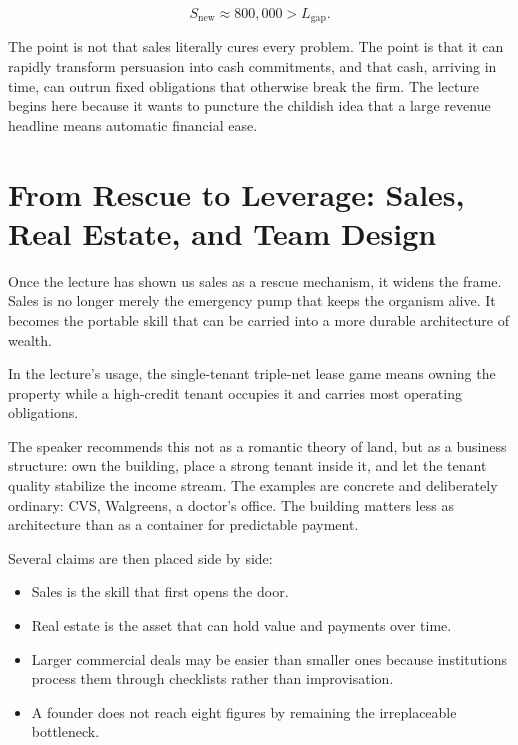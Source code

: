 \begin{equation}
S_{\text{new}} \approx 800{,}000 > L_{\text{gap}}.
\end{equation}

The point is not that sales literally cures every problem. The point is that it can rapidly transform persuasion into cash commitments, and that cash, arriving in time, can outrun fixed obligations that otherwise break the firm. The lecture begins here because it wants to puncture the childish idea that a large revenue headline means automatic financial ease.

\section{From Rescue to Leverage: Sales, Real Estate, and Team Design}

Once the lecture has shown us sales as a rescue mechanism, it widens the frame. Sales is no longer merely the emergency pump that keeps the organism alive. It becomes the portable skill that can be carried into a more durable architecture of wealth.

\begin{definition}
In the lecture's usage, the single-tenant triple-net lease game means owning the property while a high-credit tenant occupies it and carries most operating obligations.
\end{definition}

The speaker recommends this not as a romantic theory of land, but as a business structure: own the building, place a strong tenant inside it, and let the tenant quality stabilize the income stream. The examples are concrete and deliberately ordinary: CVS, Walgreens, a doctor's office. The building matters less as architecture than as a container for predictable payment.

Several claims are then placed side by side:
\begin{itemize}
\item Sales is the skill that first opens the door.
\item Real estate is the asset that can hold value and payments over time.
\item Larger commercial deals may be easier than smaller ones because institutions process them through checklists rather than improvisation.
\item A founder does not reach eight figures by remaining the irreplaceable bottleneck.
\end{itemize}

